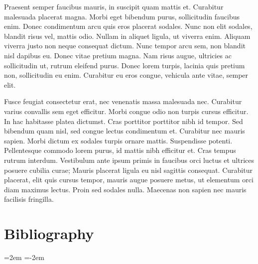 \documentclass[
]{article}
\begin{document}
Praesent semper faucibus mauris, in suscipit quam mattis et. Curabitur malesuada placerat magna. Morbi eget bibendum purus, sollicitudin faucibus enim. Donec condimentum arcu quis eros placerat sodales. Nunc non elit sodales, blandit risus vel, mattis odio. Nullam in aliquet ligula, ut viverra enim. Aliquam viverra justo non neque consequat dictum. Nunc tempor arcu sem, non blandit nisl dapibus eu. Donec vitae pretium magna. Nam risus augue, ultricies ac sollicitudin ut, rutrum eleifend purus. Donec lorem turpis, lacinia quis pretium non, sollicitudin eu enim. Curabitur eu eros congue, vehicula ante vitae, semper elit.

Fusce feugiat consectetur erat, nec venenatis massa malesuada nec. Curabitur varius convallis sem eget efficitur. Morbi congue odio non turpis cursus efficitur. In hac habitasse platea dictumst. Cras porttitor porttitor nibh id tempor. Sed bibendum quam nisl, sed congue lectus condimentum et. Curabitur nec mauris sapien. Morbi dictum ex sodales turpis ornare mattis. Suspendisse potenti. Pellentesque commodo lorem purus, id mattis nibh efficitur et. Cras tempus rutrum interdum. Vestibulum ante ipsum primis in faucibus orci luctus et ultrices posuere cubilia curae; Mauris placerat ligula eu nisl sagittis consequat. Curabitur placerat, elit quis cursus tempor, mauris augue posuere metus, ut elementum orci diam maximus lectus. Proin sed sodales nulla. Maecenas non sapien nec mauris facilisis fringilla.

\clearpage

\section*{Bibliography}

\noindent
\leftskip=2em
\parindent=-2em
\end{document}

